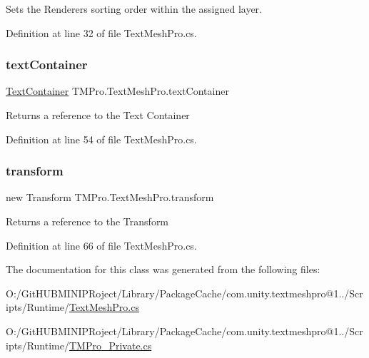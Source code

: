 Sets the Renderer\textquotesingle{}s sorting order within the assigned layer. 



Definition at line 32 of file Text\+Mesh\+Pro.\+cs.

\mbox{\label{class_t_m_pro_1_1_text_mesh_pro_a439781d7ef6aa16cd7ee1695ebb8f29f}} 
\subsubsection{\texorpdfstring{textContainer}{textContainer}}
{\footnotesize\ttfamily \mbox{\hyperlink{class_t_m_pro_1_1_text_container}{Text\+Container}} T\+M\+Pro.\+Text\+Mesh\+Pro.\+text\+Container\hspace{0.3cm}{\ttfamily [get]}}



Returns a reference to the Text Container 



Definition at line 54 of file Text\+Mesh\+Pro.\+cs.

\mbox{\label{class_t_m_pro_1_1_text_mesh_pro_a6748c431d98cca84eb55e16ad2a636ac}} 
\subsubsection{\texorpdfstring{transform}{transform}}
{\footnotesize\ttfamily new Transform T\+M\+Pro.\+Text\+Mesh\+Pro.\+transform\hspace{0.3cm}{\ttfamily [get]}}



Returns a reference to the Transform 



Definition at line 66 of file Text\+Mesh\+Pro.\+cs.



The documentation for this class was generated from the following files\+:\begin{DoxyCompactItemize}
\item 
O\+:/\+Git\+H\+U\+B\+M\+I\+N\+I\+P\+Roject/\+Library/\+Package\+Cache/com.\+unity.\+textmeshpro@1../\+Scripts/\+Runtime/\mbox{\hyperlink{_text_mesh_pro_8cs}{Text\+Mesh\+Pro.\+cs}}\item 
O\+:/\+Git\+H\+U\+B\+M\+I\+N\+I\+P\+Roject/\+Library/\+Package\+Cache/com.\+unity.\+textmeshpro@1../\+Scripts/\+Runtime/\mbox{\hyperlink{_t_m_pro___private_8cs}{T\+M\+Pro\+\_\+\+Private.\+cs}}\end{DoxyCompactItemize}
